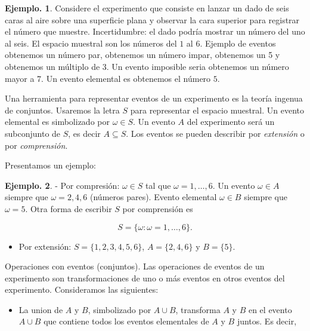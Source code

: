\documentclass[]{book}
\providecommand{\tightlist}{%
  \setlength{\itemsep}{0pt}\setlength{\parskip}{0pt}}
\theoremstyle{definition}
\theoremstyle{definition}
\newtheorem{example}{Ejemplo.}[chapter]
\theoremstyle{definition}
\theoremstyle{remark}
\begin{document}
\begin{example}
\protect\hypertarget{exm:unnamed-chunk-116}{}{\label{exm:unnamed-chunk-116} }
Considere el experimento que consiste en lanzar un dado de seis caras al
aire sobre una superficie plana y observar la cara superior para registrar
el número que muestre. Incertidumbre: el dado podría mostrar un número del
uno al seis. El espacio muestral son los números del \(1\) al \(6\). Ejemplo
de eventos obtenemos un número par, obtenemos un número impar, obtenemos
un 5 y obtenemos un múltiplo de \(3\). Un evento imposible seria
obtenemos un número mayor a 7. Un evento elemental es obtenemos el número \(5\).
\end{example}

Una herramienta para representar eventos de un experimento es la teoría
ingenua de conjuntos. Usaremos la letra \(S\) para representar el espacio
muestral. Un evento elemental es simbolizado por \(\omega \in S\). Un evento
\(A\) del experimento será un subconjunto de \(S\), es decir \(A\subseteq S\).
Los eventos se pueden describir por \emph{extensión} o por \emph{comprensión}.

Presentamos un ejemplo:

\begin{example}
\protect\hypertarget{exm:unnamed-chunk-117}{}{\label{exm:unnamed-chunk-117} }
- Por compresión: \(\omega\in S\) tal que \(\omega=1,\ldots, 6\). Un evento
\(\omega \in A\) siempre que \(\omega=2,4,6\) (números pares). Evento elemental
\(\omega \in B\) siempre que \(\omega=5\). Otra forma de escribir \(S\) por comprensión es

\[S =\{\omega: \omega=1,\ldots,6 \} . \]

\begin{itemize}
\tightlist
\item
  Por extensión: \(S=\{1,2,3,4,5,6\}\), \(A= \{2, 4, 6 \}\) y \(B=\{5\}\).
\end{itemize}
\end{example}

Operaciones con eventos (conjuntos). Las operaciones de eventos de un
experimento son transformaciones de uno o más eventos en otros eventos del
experimento. Consideramos las siguientes:

\begin{itemize}
\tightlist
\item
  La union de \(A\) y \(B\), simbolizado por \(A\cup B\), transforma \(A\) y \(B\) en
  el evento \(A\cup B\) que contiene todos los eventos elementales de \(A\) y
  \(B\) juntos. Es decir,
\end{itemize}
\end{document}
